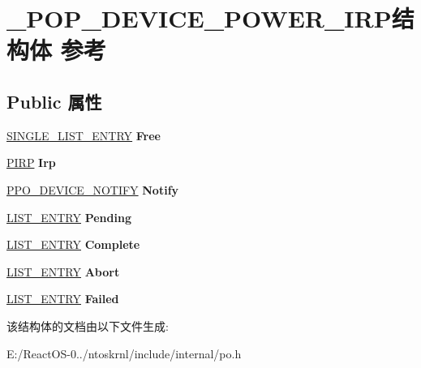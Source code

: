\hypertarget{struct___p_o_p___d_e_v_i_c_e___p_o_w_e_r___i_r_p}{}\section{\+\_\+\+P\+O\+P\+\_\+\+D\+E\+V\+I\+C\+E\+\_\+\+P\+O\+W\+E\+R\+\_\+\+I\+R\+P结构体 参考}
\label{struct___p_o_p___d_e_v_i_c_e___p_o_w_e_r___i_r_p}
\subsection*{Public 属性}
\begin{DoxyCompactItemize}
\item 
\mbox{\label{struct___p_o_p___d_e_v_i_c_e___p_o_w_e_r___i_r_p_a6002abf970c41c42ba9db80fd6adfb39}} 
\hyperlink{struct___s_i_n_g_l_e___l_i_s_t___e_n_t_r_y}{S\+I\+N\+G\+L\+E\+\_\+\+L\+I\+S\+T\+\_\+\+E\+N\+T\+RY} {\bfseries Free}
\item 
\mbox{\label{struct___p_o_p___d_e_v_i_c_e___p_o_w_e_r___i_r_p_a5e0ac68d058c68957a7d531753ab5a54}} 
\hyperlink{interfacevoid}{P\+I\+RP} {\bfseries Irp}
\item 
\mbox{\label{struct___p_o_p___d_e_v_i_c_e___p_o_w_e_r___i_r_p_a5102d85d4fd756093b080d55cb8a7cf0}} 
\hyperlink{struct___p_o___d_e_v_i_c_e___n_o_t_i_f_y}{P\+P\+O\+\_\+\+D\+E\+V\+I\+C\+E\+\_\+\+N\+O\+T\+I\+FY} {\bfseries Notify}
\item 
\mbox{\label{struct___p_o_p___d_e_v_i_c_e___p_o_w_e_r___i_r_p_aacb910954ac4d3f7ab34005ca0b355ad}} 
\hyperlink{struct___l_i_s_t___e_n_t_r_y}{L\+I\+S\+T\+\_\+\+E\+N\+T\+RY} {\bfseries Pending}
\item 
\mbox{\label{struct___p_o_p___d_e_v_i_c_e___p_o_w_e_r___i_r_p_a6e897bc5070d77c100abd66795a2a846}} 
\hyperlink{struct___l_i_s_t___e_n_t_r_y}{L\+I\+S\+T\+\_\+\+E\+N\+T\+RY} {\bfseries Complete}
\item 
\mbox{\label{struct___p_o_p___d_e_v_i_c_e___p_o_w_e_r___i_r_p_aa230a9711bec8dc8a7956f20464e4faa}} 
\hyperlink{struct___l_i_s_t___e_n_t_r_y}{L\+I\+S\+T\+\_\+\+E\+N\+T\+RY} {\bfseries Abort}
\item 
\mbox{\label{struct___p_o_p___d_e_v_i_c_e___p_o_w_e_r___i_r_p_abe7abd8722595510e2508a2f6ab015ee}} 
\hyperlink{struct___l_i_s_t___e_n_t_r_y}{L\+I\+S\+T\+\_\+\+E\+N\+T\+RY} {\bfseries Failed}
\end{DoxyCompactItemize}


该结构体的文档由以下文件生成\+:\begin{DoxyCompactItemize}
\item 
E\+:/\+React\+O\+S-\/0../ntoskrnl/include/internal/po.\+h\end{DoxyCompactItemize}
